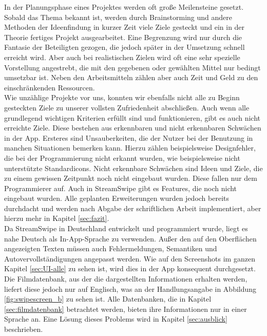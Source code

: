 In der Planungsphase eines Projektes werden oft große Meilensteine gesetzt. Sobald das Thema bekannt ist, werden durch Brainstorming und andere Methoden der Ideenfindung in kurzer Zeit viele Ziele gesteckt und ein in der Theorie fertiges Projekt ausgearbeitet. Eine Begrenzung wird nur durch die Fantasie der Beteiligten gezogen, die jedoch später in der Umsetzung schnell erreicht wird. Aber auch bei realistischen Zielen wird oft eine sehr spezielle Vorstellung angestrebt, die mit den gegebenen oder gewählten Mittel nur bedingt umsetzbar ist. Neben den Arbeitsmitteln zählen aber auch Zeit und Geld zu den einschränkenden Ressourcen.\\

\noindent
Wie unzählige Projekte vor uns, konnten wir ebenfalls nicht alle zu Beginn gesteckten Ziele zu unserer vollsten Zufriedenheit abschließen. Auch wenn alle grundlegend wichtigen Kriterien erfüllt sind und funktionieren, gibt es auch nicht erreichte Ziele. Diese bestehen aus erkennbaren und nicht erkennbaren Schwächen in der App. Ersteres sind Unsauberkeiten, die der Nutzer bei der Benutzung in manchen Situationen bemerken kann. Hierzu zählen beispielsweise Designfehler, die bei der Programmierung nicht erkannt wurden, wie beispielsweise nicht unterstützte Standardicons. Nicht erkennbare Schwächen sind Ideen und Ziele, die zu einem gewissen Zeitpunkt noch nicht eingebaut wurden. Diese fallen nur dem Programmierer auf. Auch in StreamSwipe gibt es Features, die noch nicht eingebaut wurden. Alle geplanten Erweiterungen wurden jedoch bereits durchdacht und werden nach Abgabe der schriftlichen Arbeit implementiert, aber hierzu mehr in Kapitel \ref{sec:fazit}.\\

\noindent
Da StreamSwipe in Deutschland entwickelt und programmiert wurde, liegt es nahe Deutsch als In-App-Sprache zu verwenden. Außer den auf den Oberflächen angezeigten Texten müssen auch Fehlermeldungen, Semantiken und Autovervollständigungen angepasst werden. Wie auf den Screenshots im ganzen Kapitel \ref{sec:UI-alle} zu sehen ist, wird dies in der App konsequent durchgesetzt. Die Filmdatenbank, aus der die dargestellten Informationen erhalten werden, liefert diese jedoch nur auf Englisch, was an der Handlungsangabe in Abbildung  \ref{fig:swipescreen_b} zu sehen ist. Alle Datenbanken, die in Kapitel  \ref{sec:filmdatenbank} betrachtet werden, bieten ihre Informationen nur in einer Sprache an. Eine Lösung dieses Problems wird in Kapitel \ref{sec:ausblick} beschrieben.\\

